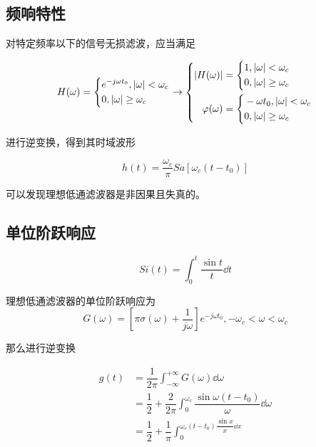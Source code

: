 \documentclass[cn,11pt,chinese,black,simple]{../elegantbook}
\begin{document}
\subsection{频响特性}

对特定频率以下的信号无损滤波，应当满足

\begin{equation*}
    H(\omega) = 
    \left\{
        \begin{aligned}
            &e^{-j \omega t_0}, \left| \omega \right| < \omega_c\\
            &0, \left| \omega \right| \geq \omega_c
        \end{aligned}
    \right.
    \rightarrow
    \left\{
    \begin{aligned}
        \left| H(\omega) \right| &= \left\{ 
            \begin{aligned}
                &1, \left| \omega \right| < \omega_c \\ 
            &0 , \left| \omega \right| \geq \omega_c     
            \end{aligned}
        \right. \\
        \varphi(\omega) &= \left\{
            \begin{aligned}
                & -\omega t_0, \left| \omega \right| < \omega_c\\
                & 0, \left| \omega \right| \geq \omega_c
            \end{aligned}
        \right.
    \end{aligned}
    \right.
\end{equation*}

进行逆变换，得到其时域波形

\[h(t) = \dfrac{\omega_c}{\pi} Sa\left[\omega_c(t-t_0)\right]\]

可以发现理想低通滤波器是非因果且失真的。

\subsection{单位阶跃响应}

\begin{definition}[\(Si\) 函数]
    \[Si(t) = \int_0^t \dfrac{\sin t }{t} \dd{t}\]
\end{definition}

理想低通滤波器的单位阶跃响应为 
\[G(\omega) = \left[\pi \sigma(\omega) + \dfrac{1}{j \omega} \right] e^{-j \omega t_0}, -\omega_c < \omega < \omega_c\]

那么进行逆变换

\begin{equation*}
    \begin{aligned}
        g(t) &= \dfrac{1}{2 \pi} \int_{-\infty}^{+\infty} G(\omega) \dd{\omega}\\
        &= \dfrac{1}{2} + \dfrac{2}{2 \pi}  \int_0^{\omega_c} \dfrac{\sin \omega (t-t_0)}{\omega} \dd{\omega}\\
        &= \dfrac{1}{2} + \dfrac{1}{\pi} \int_0^{\omega_c (t-t_0) \dfrac{\sin x}{x} \dd{x}}
    \end{aligned}
\end{equation*}
\end{document}
